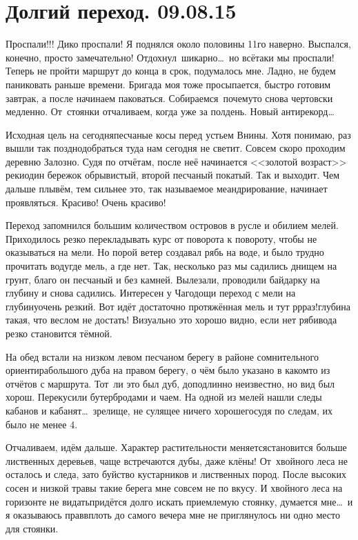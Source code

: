 \chapter{Долгий переход. 09.08.15}

Проспали!!! Дико проспали! Я поднялся около половины 11\sdash го наверно. Выспался, конечно, просто замечательно! Отдохнул~шикарно\ldots~но всё\sdash таки мы проспали! Теперь не пройти маршрут до конца в срок, подумалось мне. Ладно, не будем паниковать раньше времени. Бригада моя тоже просыпается, быстро готовим завтрак, а после начинаем паковаться. Собираемся~почему\sdash то снова чертовски медленно. От~стоянки отчаливаем, когда уже за полдень. Новый антирекорд\ldots~

Исходная цель на сегодня\mdash песчаные косы перед устьем Внины. Хотя понимаю, раз вышли так поздно\mdash добраться туда нам сегодня не светит. Совсем скоро проходим деревню Залозно. Судя по отчётам, после неё начинается <<золотой возраст>> реки\mdash один бережок обрывистый, второй песчаный покатый. Так и выходит. Чем дальше плывём, тем сильнее это, так называемое меандрирование, начинает проявляться. Красиво! Очень красиво! 

Переход запомнился большим количеством островов в русле и обилием мелей. Приходилось резко перекладывать курс от поворота к повороту, чтобы не оказываться на мели. Но порой ветер создавал рябь на воде, и было трудно прочитать воду\mdash где мель, а где нет. Так, несколько раз мы садились днищем на грунт, благо он песчаный и без камней. Вылезали, проводили байдарку на глубину и снова садились. Интересен у Чагодощи переход с мели на глубину\mdash очень резкий. Вот идёт достаточно протяжённая мель и тут р\sdash р\sdash раз!\mdash глубина такая, что веслом не достать! Визуально это хорошо видно, если нет ряби\mdash вода резко становится тёмной.

На обед встали на низком левом песчаном берегу в районе сомнительного ориентира\mdash большого дуба на правом берегу, о чём было указано в каком\sdash то из отчётов с маршрута. Тот~ли это был дуб, доподлинно неизвестно, но вид был хорош. Перекусили бутербродами и чаем. На одной из мелей нашли следы кабанов и кабанят\ldots~зрелище, не сулящее ничего хорошего\mdash судя по следам, их было не менее 4. 

Отчаливаем, идём дальше. Характер растительности меняется\mdash становится больше лиственных деревьев, чаще встречаются дубы, даже клёны! От~хвойного леса не осталось и следа, зато буйство кустарников и лиственных пород. После высоких сосен и низкой травы такие берега мне совсем не по вкусу. И хвойного леса на горизонте не видать\mdash придётся долго искать приемлемую стоянку, думается мне\ldots~и я оказываюсь прав\mdash вплоть до самого вечера мне не приглянулось ни одно место для стоянки.

